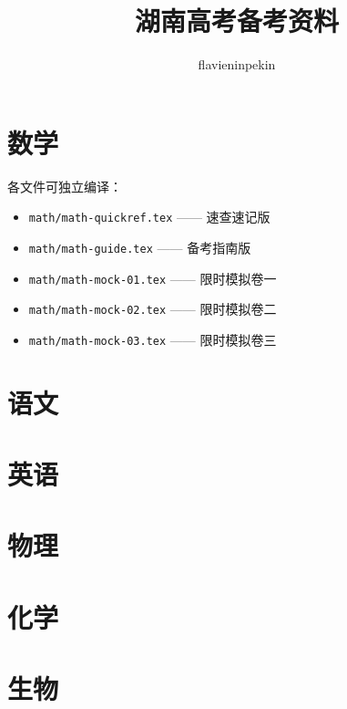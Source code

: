 \documentclass[12pt,a4paper]{ctexbook}
\title{\textbf{湖南高考备考资料}}
\author{flavieninpekin}
\date{}
\begin{document}
\maketitle
\tableofcontents

\part{数学}
各文件可独立编译：
\begin{itemize}
  \item \texttt{math/math-quickref.tex} —— 速查速记版
  \item \texttt{math/math-guide.tex} —— 备考指南版
  \item \texttt{math/math-mock-01.tex} —— 限时模拟卷一
  \item \texttt{math/math-mock-02.tex} —— 限时模拟卷二
  \item \texttt{math/math-mock-03.tex} —— 限时模拟卷三
\end{itemize}

\part{语文}


\part{英语}


\part{物理}


\part{化学}


\part{生物}

\end{document}
